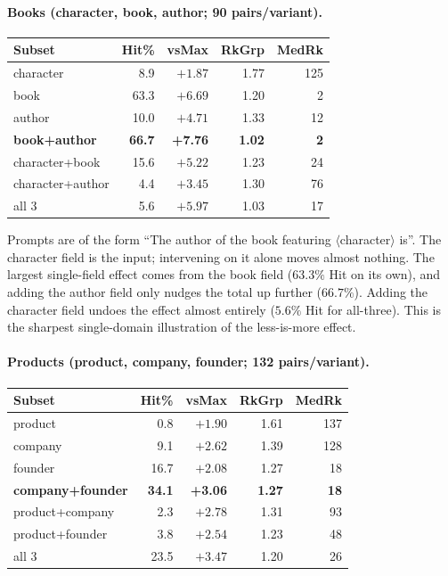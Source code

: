 \paragraph{Books (character, book, author; 90 pairs/variant).}
\begin{center}\small
\begin{tabular}{lrrrr}
\toprule
Subset & Hit\% & vsMax & RkGrp & MedRk \\
\midrule
character        &  8.9 & $+1.87$ & 1.77 & 125 \\
book             & 63.3 & $+6.69$ & 1.20 & 2 \\
author           & 10.0 & $+4.71$ & 1.33 & 12 \\
\textbf{book+author} & \textbf{66.7} & \textbf{+7.76} & \textbf{1.02} & \textbf{2} \\
character+book   & 15.6 & $+5.22$ & 1.23 & 24 \\
character+author &  4.4 & $+3.45$ & 1.30 & 76 \\
all 3            &  5.6 & $+5.97$ & 1.03 & 17 \\
\bottomrule
\end{tabular}
\end{center}

Prompts are of the form ``The author of the book featuring $\langle$character$\rangle$ is''. The character field is the input; intervening on it alone moves almost nothing. The largest single-field effect comes from the book field ($63.3\%$ Hit on its own), and adding the author field only nudges the total up further ($66.7\%$). Adding the character field undoes the effect almost entirely ($5.6\%$ Hit for all-three). This is the sharpest single-domain illustration of the less-is-more effect.

\paragraph{Products (product, company, founder; 132 pairs/variant).}
\begin{center}\small
\begin{tabular}{lrrrr}
\toprule
Subset & Hit\% & vsMax & RkGrp & MedRk \\
\midrule
product              &  0.8 & $+1.90$ & 1.61 & 137 \\
company              &  9.1 & $+2.62$ & 1.39 & 128 \\
founder              & 16.7 & $+2.08$ & 1.27 & 18 \\
\textbf{company+founder} & \textbf{34.1} & \textbf{+3.06} & \textbf{1.27} & \textbf{18} \\
product+company      &  2.3 & $+2.78$ & 1.31 & 93 \\
product+founder      &  3.8 & $+2.54$ & 1.23 & 48 \\
all 3                & 23.5 & $+3.47$ & 1.20 & 26 \\
\bottomrule
\end{tabular}
\end{center}


